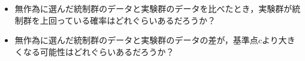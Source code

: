 \begin{itemize}
	\item 無作為に選んだ統制群のデータと実験群のデータを比べたとき，実験群が統制群を上回っている確率はどれぐらいあるだろうか？
	\item 無作為に選んだ統制群のデータと実験群のデータの差が，基準点$c$より大きくなる可能性はどれぐらいあるだろうか？
\end{itemize}

